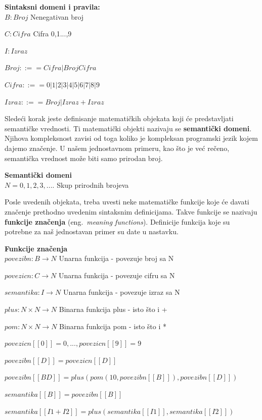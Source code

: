 \documentclass[a4paper]{article}
\begin{document}
\begin{tcolorbox}
\textbf{Sintaksni domeni i pravila:}
\\

$B: Broj $  \qquad\qquad Nenegativan broj

$C: Cifra $ \qquad\qquad Cifra 0,1...,9

$I: Izraz $

$ Broj ::== Cifra | Broj Cifra $

$ Cifra ::== 0 | 1 | 2 | 3 | 4 | 5 | 6 | 7 | 8 | 9 $

$ Izraz ::== Broj | Izraz+Izraz $
\end{tcolorbox}

Sledeći korak jeste definisanje matematičkih objekata koji će predstavljati semantičke vrednosti.  Ti matematički objekti nazivaju se \textbf{semantički domeni}. Njihova kompleksnost zavisi od toga koliko je kompleksan programski jezik kojem dajemo značenje. U našem jednostavnom primeru, kao što je već rečeno, semantička vrednost može biti samo prirodan broj.
\begin{tcolorbox}
\textbf{Semantički domeni}
\\

$N={0,1,2,3,....} $  \qquad\qquad Skup prirodnih brojeva

\end{tcolorbox}
Posle uvedenih objekata, treba uvesti neke matematičke funkcije koje će davati značenje prethodno uvedenim sintaksnim definicijama. Takve funkcije se nazivaju \textbf{funkcije značenja }(eng.~{\em meaning functions}). Definicije funkcija koje su potrebne za naš jednostavan primer su date u nastavku.
\begin{tcolorbox}
\textbf{Funkcije značenja}
\\

$povezibn: B \rightarrow N $  \qquad Unarna funkcija - povezuje broj sa N

$povezicn: C \rightarrow N $  \qquad Unarna funkcija - povezuje cifru sa N

$semantika: I \rightarrow N $   \qquad Unarna funkcija - povezuje izraz sa N

$plus: N \times N \rightarrow N $  \qquad Binarna funkcija plus - isto što i +

$pom: N \times N \rightarrow N $ \qquad Binarna funkcija pom - isto što i *

$ povezicn[[0]] = 0,... ,povezicn[[9]] = 9 $

$ povezibn[[D]] = povezicn[[D]] $

$ povezibn[[B D]] = plus(pom(10, povezibn[[B]]),povezibn[[D]]) $

$ semantika[[B]] = povezibn[[B]] $

$ semantika[[I1 + I2]] = plus(semantika[[I1]],semantika[[I2]]) $

\end{tcolorbox}
\end{document}
